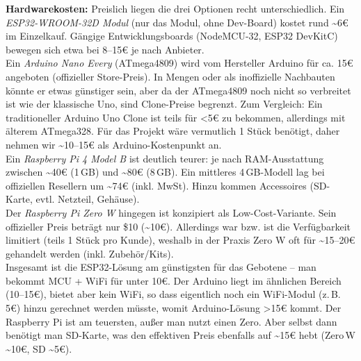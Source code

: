 \textbf{Hardwarekosten:} Preislich liegen die drei Optionen recht unterschiedlich. Ein \textit{ESP32-WROOM-32D Modul} (nur das Modul, ohne Dev-Board) kostet rund \textasciitilde6\;€ im Einzelkauf. \autocite{esp_price} Gängige Entwicklungsboards (NodeMCU-32, ESP32 DevKitC) bewegen sich etwa bei 8–15\;€ je nach Anbieter. 
\\
Ein \textit{Arduino Nano Every} (ATmega4809) wird vom Hersteller Arduino für ca. 15\;€ angeboten (offizieller Store-Preis). \autocite{arduino_price} In Mengen oder als inoffizielle Nachbauten könnte er etwas günstiger sein, aber da der ATmega4809 noch nicht so verbreitet ist wie der klassische Uno, sind Clone-Preise begrenzt. Zum Vergleich: Ein traditioneller Arduino Uno Clone ist teils für <5\;€ zu bekommen, allerdings mit älterem ATmega328. Für das Projekt wäre vermutlich 1 Stück benötigt, daher nehmen wir \textasciitilde10–15\;€ als Arduino-Kostenpunkt an. 
\\
Ein \textit{Raspberry Pi 4 Model B} ist deutlich teurer: je nach RAM-Ausstattung zwischen \textasciitilde40\;€ (1\,GB) und \textasciitilde80\;€ (8\,GB). Ein mittleres 4\,GB-Modell lag bei offiziellen Resellern um \textasciitilde74\;€ (inkl. MwSt). \autocite{raspberry_pi_price} Hinzu kommen Accessoires (SD-Karte, evtl. Netzteil, Gehäuse). 
\\
Der \textit{Raspberry Pi Zero W} hingegen ist konzipiert als Low-Cost-Variante. Sein offizieller Preis beträgt nur \$10 (\textasciitilde10\;€). \autocite{raspberry_pi_w_price} Allerdings war bzw. ist die Verfügbarkeit limitiert (teils 1 Stück pro Kunde), weshalb in der Praxis Zero W oft für \textasciitilde15–20\;€ gehandelt werden (inkl. Zubehör/Kits). 
\\
Insgesamt ist die ESP32-Lösung am günstigsten für das Gebotene – man bekommt MCU + WiFi für unter 10\;€. Der Arduino liegt im ähnlichen Bereich (10–15\;€), bietet aber kein WiFi, so dass eigentlich noch ein WiFi-Modul (z.\,B. 5\;€) hinzu gerechnet werden müsste, womit Arduino-Lösung >15\;€ kommt. Der Raspberry Pi ist am teuersten, außer man nutzt einen Zero. Aber selbst dann benötigt man SD-Karte, was den effektiven Preis ebenfalls auf \textasciitilde15\;€ hebt (Zero\,W \textasciitilde10\;€, SD \textasciitilde5\;€).


\vspace{5mm}

